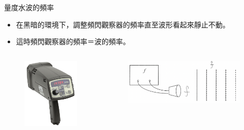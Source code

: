 \documentclass[13pt]{beamer}
\begin{document}
\begin{frame}{量度水波的頻率}
    \begin{itemize}
        \item 在黑暗的環境下，調整頻閃觀察器的頻率直至波形看起來靜止不動。
        \item 這時頻閃觀察器的頻率＝波的頻率。
    \end{itemize}\bigskip
    \begin{columns}
        \begin{figure}
            \centering
            \includegraphics[width=0.6\linewidth]{images/Screenshot 2023-09-26 at 10.05.09 PM.png}


        \end{figure}
        \begin{figure}
            \centering
            \includegraphics[width=1\linewidth]{images/Screenshot 2023-09-26 at 10.08.47 PM.png}


        \end{figure}
    \end{columns}
\end{frame}
\end{document}
